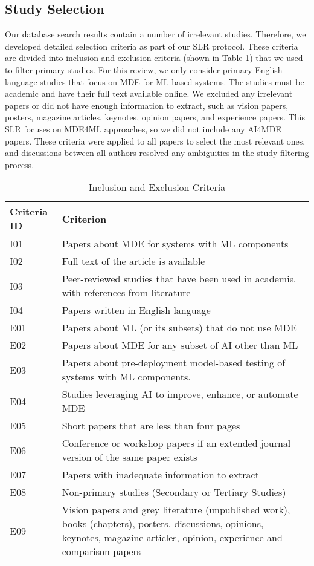 \subsection{Study Selection}
Our database search results contain a number of irrelevant studies. Therefore, we developed detailed selection criteria as part of our SLR protocol. These criteria are divided into inclusion and exclusion criteria (shown in Table \ref{table:inclusion}) that we used to filter primary studies. For this review, we only consider primary English-language studies that focus on MDE for ML-based systems. The studies must be academic and have their full text available online. We excluded any irrelevant papers or did not have enough information to extract, such as vision papers, posters, magazine articles, keynotes, opinion papers, and experience papers. This SLR focuses on MDE4ML approaches, so we did not include any AI4MDE papers. These criteria were applied to all papers to select the most relevant ones, and discussions between all authors resolved any ambiguities in the study filtering process.

\begin{table}[htbp]
\centering
\caption{Inclusion and Exclusion Criteria}
\label{table:inclusion}
\footnotesize
\begin{tabular}{ p{2cm} p{13cm}} 
\hline
\textbf{Criteria ID} & \textbf{Criterion} \TBstrut \\
\hline
I01 & Papers about MDE for systems with ML components \TBstrut \\ 
I02 & Full text of the article is available  \TBstrut \\
I03 & Peer-reviewed studies that have been used in academia with references from literature  \TBstrut \\
I04 & Papers written in English language  \TBstrut \\
\hline
\hline

E01 & Papers about ML (or its subsets) that do not use MDE \TBstrut \\ 
E02 & Papers about MDE for any subset of AI other than ML  \TBstrut \\
E03 & Papers about pre-deployment model-based testing of systems with ML components.  \TBstrut \\
E04 & Studies leveraging AI to improve, enhance, or automate MDE \TBstrut \\
E05 & Short papers that are less than four pages \TBstrut \\
E06 & Conference or workshop papers if an extended journal version of the same paper exists \TBstrut \\
E07 & Papers with inadequate information to extract \TBstrut \\
E08 & Non-primary studies (Secondary or Tertiary Studies) \TBstrut \\
E09 & Vision papers and grey literature (unpublished work), books (chapters), posters, discussions, opinions, keynotes, magazine articles, opinion, experience and comparison papers \TBstrut \\
\hline
\end{tabular}
\end{table}


